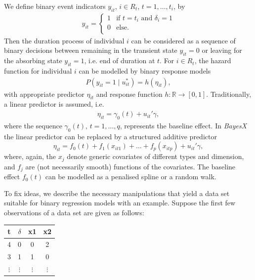 \documentclass[11pt,a4paper,twoside]{bayesxarticle}
\def \re {\mathds{R}}
\begin{document}
We define binary event indicators $y_{it}$, $i\in R_{t}$,
$t=1,\ldots,t_{i}$, by
\begin{eqnarray*}
  y_{it}=
   \left \{ \begin{array}{ll}
             1 & \mbox{if $t=t_{i}$ and $\delta_{i}=1$}\\
             0 & \mbox{else}.\\
          \end{array}   \right.
\end{eqnarray*}
Then the duration process of individual $i$ can be considered as a
sequence of binary decisions between remaining in the transient
state $y_{it}=0$ or leaving for the absorbing state $y_{it}=1$,
i.e. end of duration at $t$. For $i \in R_{t}$, the hazard
function for individual $i$ can be modelled by binary response
models
\begin{eqnarray} \label{gleichung1}
 P(y_{it}=1\mid u_{it}^*)=h(\eta_{it}),
\end{eqnarray}
with appropriate predictor $\eta_{it}$ and response function $h: \re
\rightarrow [0,1]$. Traditionally, a linear predictor is assumed,
i.e.
\begin{eqnarray} \label{gleichung2}
\eta_{it}= \gamma_{0}(t)+u_{it}' \gamma,
\end{eqnarray}
where the sequence ${\gamma_{0}(t),\, t=1,\ldots,q}$, represents the
baseline effect. In {\em BayesX} the linear predictor can be
replaced by a structured additive predictor
\begin{equation}
\label{gampred2} \eta_{it}=f_0(t) +
f_{1}(x_{it1})+\dots+f_{p}(x_{itp})+u_{it}'\gamma,
\end{equation}
where, again, the $x_j$ denote generic covariates of different types
and dimension, and $f_j$ are (not necessarily smooth) functions of
the covariates. The baseline effect $f_0(t)$ can be modelled as a
penalised spline or a random walk.

To fix ideas, we describe the necessary manipulations that yield a
data set suitable for binary regression models with an example.
Suppose the first few observations of a data set are given as
follows:

\begin{center}
\begin{tabular}{c|c|c|c}
 t & $\delta$ & x1 & x2\\\hline\hline
 4 & 0& 0 &2\\\hline
 3 & 1 &1 &0\\\hline
 $\vdots$ & $\vdots$ & $\vdots$ & $\vdots$
\end{tabular}
\end{center}
\end{document}
